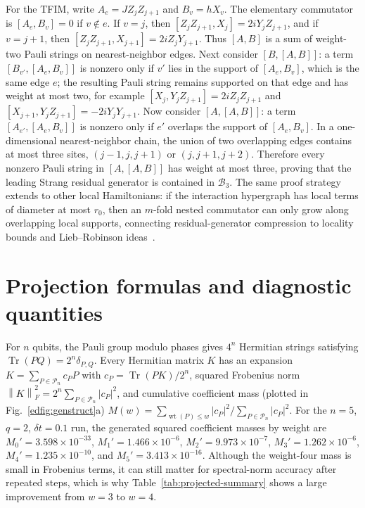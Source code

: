 \documentclass[aps,prxquantum,reprint,superscriptaddress,nofootinbib,amsmath,amssymb]{revtex4-2}
\newcommand{\tfim}{TFIM}
\newcommand{\norm}[1]{\left\lVert #1 \right\rVert}
\newcommand{\abs}[1]{\left\lvert #1 \right\rvert}
\newcommand{\Tr}{\operatorname{Tr}}
\newcommand{\cB}{\mathcal{B}}
\newcommand{\cP}{\mathcal{P}}
\newcommand{\dt}{\delta t}
\begin{document}
For the \tfim{}, write $A_e=JZ_jZ_{j+1}$ and $B_v=hX_v$. The elementary commutator is $[A_e,B_v]=0$ if $v\notin e$. If $v=j$, then $[Z_jZ_{j+1},X_j]=2iY_jZ_{j+1}$, and if $v=j+1$, then $[Z_jZ_{j+1},X_{j+1}]=2iZ_jY_{j+1}$. Thus $[A,B]$ is a sum of weight-two Pauli strings on nearest-neighbor edges. Next consider $[B,[A,B]]$: a term $[B_{v'},[A_e,B_v]]$ is nonzero only if $v'$ lies in the support of $[A_e,B_v]$, which is the same edge $e$; the resulting Pauli string remains supported on that edge and has weight at most two, for example $[X_j,Y_jZ_{j+1}]=2iZ_jZ_{j+1}$ and $[X_{j+1},Y_jZ_{j+1}]=-2iY_jY_{j+1}$. Now consider $[A,[A,B]]$: a term $[A_{e'},[A_e,B_v]]$ is nonzero only if $e'$ overlaps the support of $[A_e,B_v]$. In a one-dimensional nearest-neighbor chain, the union of two overlapping edges contains at most three sites, $(j-1,j,j+1)$ or $(j,j+1,j+2)$. Therefore every nonzero Pauli string in $[A,[A,B]]$ has weight at most three, proving that the leading Strang residual generator is contained in $\cB_3$. The same proof strategy extends to other local Hamiltonians: if the interaction hypergraph has local terms of diameter at most $r_0$, then an $m$-fold nested commutator can only grow along overlapping local supports, connecting residual-generator compression to locality bounds and Lieb--Robinson ideas~\cite{lieb1972,tran2020}.

\section{Projection formulas and diagnostic quantities}
\label{app:projection}

For $n$ qubits, the Pauli group modulo phases gives $4^n$ Hermitian strings satisfying $\Tr(PQ)=2^n\delta_{P,Q}$. Every Hermitian matrix $K$ has an expansion $K=\sum_{P\in\cP_n} c_P P$ with $c_P=\Tr(PK)/2^n$, squared Frobenius norm $\norm{K}_F^2=2^n\sum_{P\in\cP_n}\abs{c_P}^2$, and cumulative coefficient mass (plotted in Fig.~\ref{edfig:genstruct}a) $M(w)=\sum_{\operatorname{wt}(P)\leq w}\abs{c_P}^2/\sum_{P\in\cP_n}\abs{c_P}^2$. For the $n=5$, $q=2$, $\dt=0.1$ run, the generated squared coefficient masses by weight are $M_0'=3.598\times10^{-33}$, $M_1'=1.466\times10^{-6}$, $M_2'=9.973\times10^{-7}$, $M_3'=1.262\times10^{-6}$, $M_4'=1.235\times10^{-10}$, and $M_5'=3.413\times10^{-16}$. Although the weight-four mass is small in Frobenius terms, it can still matter for spectral-norm accuracy after repeated steps, which is why Table~\ref{tab:projected-summary} shows a large improvement from $w=3$ to $w=4$.
\end{document}
